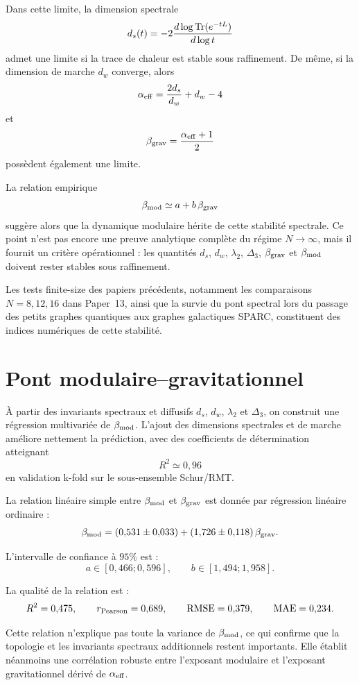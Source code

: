 \documentclass[11pt,a4paper]{article}
\begin{document}
Dans cette limite, la dimension spectrale
\[
d_s(t)
=
-2\frac{d\log {\rm Tr}(e^{-tL})}{d\log t}
\]
admet une limite si la trace de chaleur est stable sous raffinement. De même,
si la dimension de marche \(d_w\) converge, alors
\[
\alpha_{\rm eff}
=
\frac{2d_s}{d_w}+d_w-4
\]
et
\[
\beta_{\rm grav}
=
\frac{\alpha_{\rm eff}+1}{2}
\]
possèdent également une limite.

La relation empirique
\[
\beta_{\rm mod}
\simeq
a+b\,\beta_{\rm grav}
\]
suggère alors que la dynamique modulaire hérite de cette stabilité spectrale.
Ce point n'est pas encore une preuve analytique complète du régime
\(N\to\infty\), mais il fournit un critère opérationnel : les quantités
\(d_s\), \(d_w\), \(\lambda_2\), \(\Delta_3\), \(\beta_{\rm grav}\) et
\(\beta_{\rm mod}\) doivent rester stables sous raffinement.

Les tests finite-size des papiers précédents, notamment les comparaisons
\(N=8,12,16\) dans Paper~13, ainsi que la survie du pont spectral lors du
passage des petits graphes quantiques aux graphes galactiques SPARC,
constituent des indices numériques de cette stabilité.

\section{Pont modulaire--gravitationnel}

À partir des invariants spectraux et diffusifs \(d_s\), \(d_w\),
\(\lambda_2\) et \(\Delta_3\), on construit une régression multivariée de
\(\beta_{\rm mod}\). L'ajout des dimensions spectrales et de marche améliore
nettement la prédiction, avec des coefficients de détermination atteignant
\[
R^2 \simeq 0{,}96
\]
en validation k-fold sur le sous-ensemble Schur/RMT.

La relation linéaire simple entre \(\beta_{\rm mod}\) et
\(\beta_{\rm grav}\) est donnée par régression linéaire ordinaire :
\[
\beta_{\rm mod}
=
(0{,}531 \pm 0{,}033)
+
(1{,}726 \pm 0{,}118)\,\beta_{\rm grav}.
\]

L'intervalle de confiance à \(95\%\) est :
\[
a \in [0{,}466 ; 0{,}596],
\qquad
b \in [1{,}494 ; 1{,}958].
\]

La qualité de la relation est :
\[
R^2 = 0{,}475,
\qquad
r_{\rm Pearson} = 0{,}689,
\qquad
{\rm RMSE} = 0{,}379,
\qquad
{\rm MAE} = 0{,}234.
\]

Cette relation n'explique pas toute la variance de \(\beta_{\rm mod}\), ce
qui confirme que la topologie et les invariants spectraux additionnels
restent importants. Elle établit néanmoins une corrélation robuste entre
l'exposant modulaire et l'exposant gravitationnel dérivé de
\(\alpha_{\rm eff}\).
\end{document}
